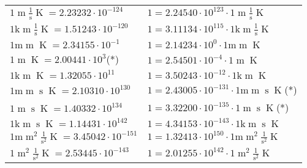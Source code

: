 \begin{center}
\begin{longtable}{l l}
{\color{black}$1 \bm{\mathrm{ }}{\operatorname{m}}\frac1{\operatorname{s}}{}{\operatorname{K}} = 2.23232\cdot10^{-124} $}   & {\color{black}$ 1 = 2.24540\cdot10^{123} \cdot 1 \bm{\mathrm{ }}{\operatorname{m}}\frac1{\operatorname{s}}{}{\operatorname{K}}$}  \\
{\color{gray}$1 \bm{\mathrm{ k}}{\operatorname{m}}\frac1{\operatorname{s}}{}{\operatorname{K}} = 1.51243\cdot10^{-120} $}   & {\color{gray}$ 1 = 3.11134\cdot10^{115} \cdot 1 \bm{\mathrm{ k}}{\operatorname{m}}\frac1{\operatorname{s}}{}{\operatorname{K}}$}  \\
{\color{gray}$1 \bm{\mathrm{ m}}{\operatorname{m}}{}{}{\operatorname{K}} = 2.34155\cdot10^{-1} $}   & {\color{gray}$ 1 = 2.14234\cdot10^{0} \cdot 1 \bm{\mathrm{ m}}{\operatorname{m}}{}{}{\operatorname{K}}$}  \\
{\color{black}$1 \bm{\mathrm{ }}{\operatorname{m}}{}{}{\operatorname{K}} = 2.00441\cdot10^{3} $}\quad(*) & {\color{black}$ 1 = 2.54501\cdot10^{-4} \cdot 1 \bm{\mathrm{ }}{\operatorname{m}}{}{}{\operatorname{K}}$}  \\
{\color{gray}$1 \bm{\mathrm{ k}}{\operatorname{m}}{}{}{\operatorname{K}} = 1.32055\cdot10^{11} $}   & {\color{gray}$ 1 = 3.50243\cdot10^{-12} \cdot 1 \bm{\mathrm{ k}}{\operatorname{m}}{}{}{\operatorname{K}}$}  \\
{\color{gray}$1 \bm{\mathrm{ m}}{\operatorname{m}}{\operatorname{s}}{}{\operatorname{K}} = 2.10310\cdot10^{130} $}   & {\color{gray}$ 1 = 2.43005\cdot10^{-131} \cdot 1 \bm{\mathrm{ m}}{\operatorname{m}}{\operatorname{s}}{}{\operatorname{K}}$}\quad(*)\\
{\color{black}$1 \bm{\mathrm{ }}{\operatorname{m}}{\operatorname{s}}{}{\operatorname{K}} = 1.40332\cdot10^{134} $}   & {\color{black}$ 1 = 3.32200\cdot10^{-135} \cdot 1 \bm{\mathrm{ }}{\operatorname{m}}{\operatorname{s}}{}{\operatorname{K}}$}\quad(*)\\
{\color{gray}$1 \bm{\mathrm{ k}}{\operatorname{m}}{\operatorname{s}}{}{\operatorname{K}} = 1.14431\cdot10^{142} $}   & {\color{gray}$ 1 = 4.34153\cdot10^{-143} \cdot 1 \bm{\mathrm{ k}}{\operatorname{m}}{\operatorname{s}}{}{\operatorname{K}}$}  \\
{\color{gray}$1 \bm{\mathrm{ m}}{\operatorname{m}^2}\frac1{\operatorname{s}^2}{}{\operatorname{K}} = 3.45042\cdot10^{-151} $}   & {\color{gray}$ 1 = 1.32413\cdot10^{150} \cdot 1 \bm{\mathrm{ m}}{\operatorname{m}^2}\frac1{\operatorname{s}^2}{}{\operatorname{K}}$}  \\
{\color{black}$1 \bm{\mathrm{ }}{\operatorname{m}^2}\frac1{\operatorname{s}^2}{}{\operatorname{K}} = 2.53445\cdot10^{-143} $}   & {\color{black}$ 1 = 2.01255\cdot10^{142} \cdot 1 \bm{\mathrm{ }}{\operatorname{m}^2}\frac1{\operatorname{s}^2}{}{\operatorname{K}}$}  \\

\end{longtable}
\end{center}
